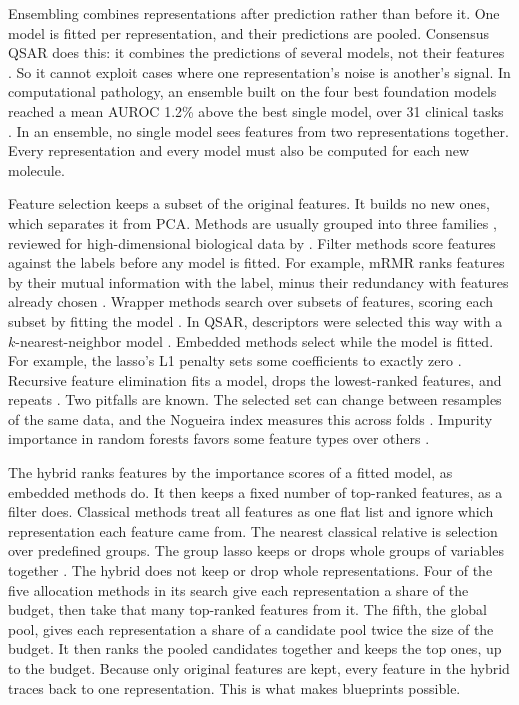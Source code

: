 


Ensembling combines representations after prediction rather than before it. One model is fitted per representation, and their predictions are pooled. Consensus QSAR does this: it combines the predictions of several models, not their features \citep{Valsecchi2020}. So it cannot exploit cases where one representation's noise is another's signal. In computational pathology, an ensemble built on the four best foundation models reached a mean AUROC 1.2\% above the best single model, over 31 clinical tasks \citep{ElNahhas2025}. In an ensemble, no single model sees features from two representations together. Every representation and every model must also be computed for each new molecule.

Feature selection keeps a subset of the original features. It builds no new ones, which separates it from PCA. Methods are usually grouped into three families \citep{Guyon2003}, reviewed for high-dimensional biological data by \citet{Saeys2007}. Filter methods score features against the labels before any model is fitted. For example, mRMR ranks features by their mutual information with the label, minus their redundancy with features already chosen \citep{Peng2005}. Wrapper methods search over subsets of features, scoring each subset by fitting the model \citep{Kohavi1997}. In QSAR, descriptors were selected this way with a $k$-nearest-neighbor model \citep{Zheng2000}. Embedded methods select while the model is fitted. For example, the lasso's L1 penalty sets some coefficients to exactly zero \citep{Tibshirani1996}. Recursive feature elimination fits a model, drops the lowest-ranked features, and repeats \citep{Guyon2002}. Two pitfalls are known. The selected set can change between resamples of the same data, and the Nogueira index measures this across folds \citep{Nogueira2018}. Impurity importance in random forests favors some feature types over others \citep{Strobl2007}.

The hybrid ranks features by the importance scores of a fitted model, as embedded methods do. It then keeps a fixed number of top-ranked features, as a filter does. Classical methods treat all features as one flat list and ignore which representation each feature came from. The nearest classical relative is selection over predefined groups. The group lasso keeps or drops whole groups of variables together \citep{Yuan2006}. The hybrid does not keep or drop whole representations. Four of the five allocation methods in its search give each representation a share of the budget, then take that many top-ranked features from it. The fifth, the global pool, gives each representation a share of a candidate pool twice the size of the budget. It then ranks the pooled candidates together and keeps the top ones, up to the budget. Because only original features are kept, every feature in the hybrid traces back to one representation. This is what makes blueprints possible.

